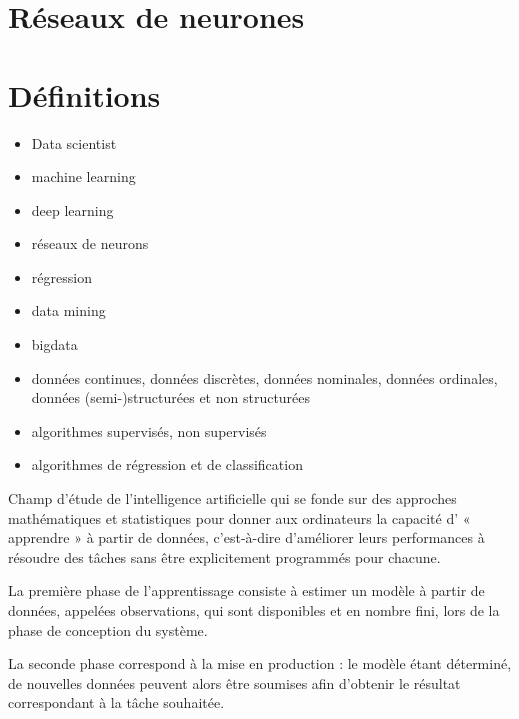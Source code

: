 \section{Réseaux de neurones}


\newpage

\section{Définitions}

\begin{itemize}
\item Data scientist
\item machine learning
\item deep learning
\item réseaux de neurons
\item régression
\item data mining
\item bigdata
\item données continues, données discrètes, données nominales, données ordinales, données (semi-)structurées et non structurées

\end{itemize}


\begin{itemize}
\item algorithmes supervisés, non supervisés
\item algorithmes de régression et de classification
\end{itemize}

\begin{defi} 
Champ d'étude de l'intelligence artificielle qui se fonde sur des approches mathématiques et statistiques pour donner aux ordinateurs la capacité d' « apprendre » à partir de données, c'est-à-dire d'améliorer leurs performances à résoudre des tâches sans être explicitement programmés pour chacune. 

La première phase de l'apprentissage consiste à estimer un modèle à partir de données, appelées observations, qui sont disponibles et en nombre fini, lors de la phase de conception du système.

 La seconde phase correspond à la mise en production : le modèle étant déterminé, de nouvelles données peuvent alors être soumises afin d'obtenir le résultat correspondant à la tâche souhaitée.
\end{defi}


